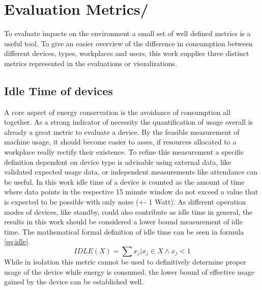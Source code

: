 \section{ \texorpdfstring{Evaluation Metrics/ }{Evaluation Metrics / KPI}}\label{sec:metrics}
To evaluate impacts on the environment a small set of well defined metrics is a useful tool. To give an easier overview of the difference in consumption between different devices, types, workplaces and users, this work supplies three distinct metrics represented in the evaluations or visualizations. 

\subsection{Idle Time of devices}\label{subsec:idle}
A core aspect of energy conservation is the avoidance of consumption all together. As a strong indicator of necessity the quantification of usage overall is already a great metric to evaluate a device. By the feasible measurement of machine usage, it should become easier to asses, if resources allocated to a workplace really rectify their existence. To refine this measurement a specific definition dependent on device type is advisable using external data, like validated expected usage data, or independent measurements like attendance can be useful. In this work idle time of a device is counted as the amount of time where data points in the respective 15 minute window do not exceed a value that is expected to be possible with only noise (+- 1 Watt). As different operation modes of devices, like standby, could also contribute as idle time in general, the results in this work should be considered a lower bound measurement of idle time. The mathematical formal definition of idle time can be seen in formula \ref{eq:idle}.
\begin{equation}\label{eq:idle}
	IDLE (X) = \sum x_j \bigg\rvert x_j \in X \wedge x_j < 1
\end{equation}
While in isolation this metric cannot be used to definitively determine proper usage of the device while energy is consumed, the lower bound of effective usage gained by the device can be established well. 
